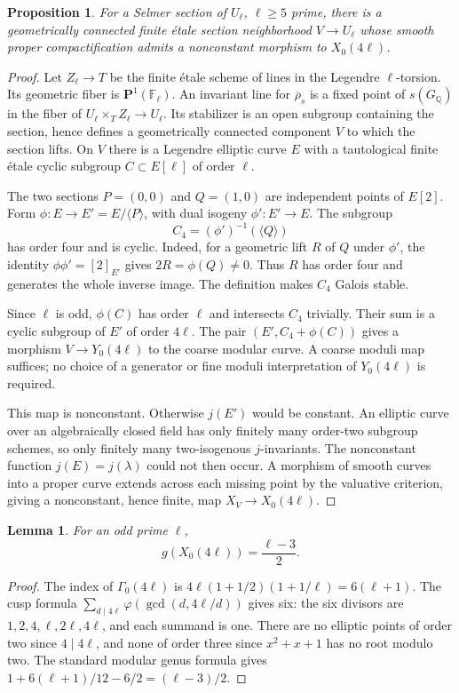 \documentclass[11pt,a4paper]{article}
\newcommand{\Q}{\mathbb Q}
\newcommand{\F}{\mathbb F}
\newcommand{\et}{\'et}
\theoremstyle{plain}
\newtheorem{proposition}[theorem]{Proposition}
\newtheorem{lemma}[theorem]{Lemma}
\theoremstyle{definition}
\begin{document}
\begin{proposition}\label{prop:fourlevel}
For a Selmer section of $U_\ell$, $\ell\geq5$ prime, there is a
geometrically connected finite \et ale section neighborhood $V\to U_\ell$
whose smooth proper compactification admits a nonconstant morphism
to $X_0(4\ell)$.
\end{proposition}
\begin{proof}
Let $Z_\ell\to T$ be the finite \et ale scheme of lines in the
Legendre $\ell$-torsion. Its geometric fiber is
$\mathbf P^1(\F_\ell)$. An invariant line for
$\overline\rho_s$ is a fixed point of $s(G_\Q)$ in the fiber of
$U_\ell\times_T Z_\ell\to U_\ell$. Its stabilizer is an open
subgroup containing the section, hence defines a geometrically
connected component $V$ to which the section lifts. On $V$ there is
a Legendre elliptic curve $E$ with a tautological finite \et ale
cyclic subgroup $C\subset E[\ell]$ of order $\ell$.

The two sections $P=(0,0)$ and $Q=(1,0)$ are independent points of
$E[2]$. Form $\phi:E\to E'=E/\langle P\rangle$, with dual isogeny
$\phi':E'\to E$. The subgroup
\[
 C_4=(\phi')^{-1}(\langle Q\rangle)
\]
has order four and is cyclic. Indeed, for a geometric lift $R$ of
$Q$ under $\phi'$, the identity $\phi\phi'=[2]_{E'}$ gives
$2R=\phi(Q)\neq0$. Thus $R$ has order four and generates the
whole inverse image. The definition makes $C_4$ Galois stable.

Since $\ell$ is odd, $\phi(C)$ has order $\ell$ and intersects
$C_4$ trivially. Their sum is a cyclic subgroup of $E'$ of order
$4\ell$. The pair $(E',C_4+\phi(C))$ gives a morphism
$V\to Y_0(4\ell)$ to the coarse modular curve. A coarse moduli map
suffices; no choice of a generator or fine moduli interpretation
of $Y_0(4\ell)$ is required.

This map is nonconstant. Otherwise $j(E')$ would be constant. An
elliptic curve over an algebraically closed field has only finitely
many order-two subgroup schemes, so only finitely many two-isogenous
$j$-invariants. The nonconstant function $j(E)=j(\lambda)$ could
not then occur. A morphism of smooth curves into a proper curve
extends across each missing point by the valuative criterion, giving
a nonconstant, hence finite, map $X_V\to X_0(4\ell)$.
\end{proof}

\begin{lemma}\label{lem:modulargenus}
For an odd prime $\ell$,
\[
 g(X_0(4\ell))=\frac{\ell-3}{2}.
\]
\end{lemma}
\begin{proof}
The index of $\Gamma_0(4\ell)$ is
$4\ell(1+1/2)(1+1/\ell)=6(\ell+1)$. The cusp formula
$\sum_{d\mid4\ell}\varphi(\gcd(d,4\ell/d))$ gives six: the six
divisors are $1,2,4,\ell,2\ell,4\ell$, and each summand is one.
There are no elliptic points of order two since $4\mid4\ell$, and
none of order three since $x^2+x+1$ has no root modulo two.
The standard modular genus formula gives
$1+6(\ell+1)/12-6/2=(\ell-3)/2$.
\end{proof}
\end{document}
